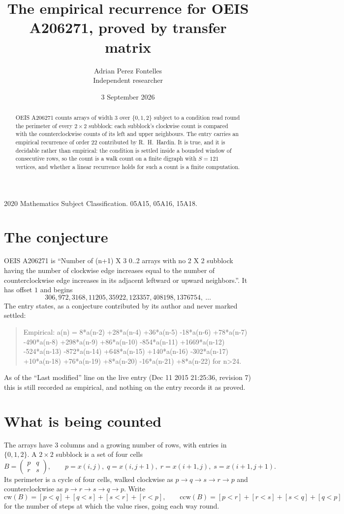 \documentclass[11pt,a4paper]{article}
\title{The empirical recurrence for OEIS A206271, proved by transfer matrix}
\author{Adrian Perez Fontelles\\ \small Independent researcher}
\date{3 September 2026}
\theoremstyle{plain}
\theoremstyle{definition}
\begin{document}
\maketitle

\begin{abstract}
OEIS A206271 counts arrays of width $3$ over $\{0,1,2\}$ subject to a condition read round the
perimeter of every $2\times2$ subblock: each subblock's clockwise count is compared with the counterclockwise counts of its left and upper neighbours. The entry carries an empirical recurrence of
order $22$ contributed by R.~H.~Hardin. It is true, and it is decidable rather than
empirical: the condition is settled inside a bounded window of consecutive rows, so the
count is a walk count on a finite digraph with $S=121$ vertices, and whether a linear
recurrence holds for such a count is a finite computation.
\end{abstract}

\noindent\small 2020 Mathematics Subject Classification. 05A15, 05A16, 15A18.\normalsize

\section{The conjecture}

OEIS A206271 is ``Number of (n+1) X 3 0..2 arrays with no 2 X 2 subblock having the number of clockwise edge increases equal to the number of counterclockwise edge increases in its adjacent leftward or upward neighbors.''. It has offset $1$ and begins
\[
306, 972, 3168, 11205, 35922, 123357, 408198, 1376754,\ \dots
\]
The entry states, as a conjecture contributed by its author and never marked settled:
\begin{quote}
Empirical: a(n) = 8*a(n-2) +28*a(n-4) +36*a(n-5) -18*a(n-6) +78*a(n-7) -490*a(n-8) +298*a(n-9) +86*a(n-10) -854*a(n-11) +1669*a(n-12) -524*a(n-13) -872*a(n-14) +648*a(n-15) +140*a(n-16) -302*a(n-17) +10*a(n-18) +76*a(n-19) +8*a(n-20) -16*a(n-21) +8*a(n-22) for n>24.
\end{quote}
As of the ``Last modified'' line on the live entry (Dec 11 2015 21:25:36, revision 7) this is still
recorded as empirical, and nothing on the entry records it as proved.

\section{What is being counted}

The arrays have $3$ columns and a growing number of rows, with entries in $\{0,1,2\}$. A
$2\times2$ subblock is a set of four cells
\[
B=\begin{pmatrix} p & q \\ r & s \end{pmatrix},
\qquad p=x(i,j),\; q=x(i,j+1),\; r=x(i+1,j),\; s=x(i+1,j+1).
\]
Its perimeter is a cycle of four cells, walked clockwise as $p\to q\to s\to r\to p$ and
counterclockwise as $p\to r\to s\to q\to p$. Write
\[
\mathrm{cw}(B)=[p<q]+[q<s]+[s<r]+[r<p],\qquad
\mathrm{ccw}(B)=[p<r]+[r<s]+[s<q]+[q<p]
\]
for the number of steps at which the value rises, going each way round.
\end{document}
